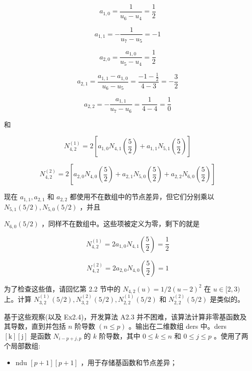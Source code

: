 \documentclass[../main.tex]{subfiles}
\begin{document}
\[
{a}_{1,0} = \frac{1}{{u}_{6} - {u}_{4}} = \frac{1}{2}
\]

\[
{a}_{1,1} =  - \frac{1}{{u}_{7} - {u}_{5}} =  - 1
\]

\[
{a}_{2,0} = \frac{{a}_{1,0}}{{u}_{5} - {u}_{4}} = \frac{1}{2}
\]

\[
{a}_{2,1} = \frac{{a}_{1,1} - {a}_{1,0}}{{u}_{6} - {u}_{5}} = \frac{-1 - \frac{1}{2}}{4 - 3} =  - \frac{3}{2}
\]

\[
{a}_{2,2} =  - \frac{{a}_{1,1}}{{u}_{7} - {u}_{6}} = \frac{1}{4 - 4} = \frac{1}{0}
\]

和

\[
{N}_{4,2}^{\left( 1\right) } = 2\left\lbrack  {{a}_{1,0}{N}_{4,1}\left( \frac{5}{2}\right)  + {a}_{1,1}{N}_{5,1}\left( \frac{5}{2}\right) }\right\rbrack
\]

\[
{N}_{4,2}^{\left( 2\right) } = 2\left\lbrack  {{a}_{2,0}{N}_{4,0}\left( \frac{5}{2}\right)  + {a}_{2,1}{N}_{5,0}\left( \frac{5}{2}\right)  + {a}_{2,2}{N}_{6,0}\left( \frac{5}{2}\right) }\right\rbrack
\]

现在 \({a}_{1,1},{a}_{2,1}\) 和 \({a}_{2,2}\) 都使用不在数组中的节点差异，但它们分别乘以 \({N}_{5,1}\left( {5/2}\right) ,{N}_{5,0}\left( {5/2}\right)\) ，并且

\({N}_{6,0}\left( {5/2}\right)\) ，同样不在数组中。这些项被定义为零，剩下的就是

\[
{N}_{4,2}^{\left( 1\right) } = 2{a}_{1,0}{N}_{4,1}\left( \frac{5}{2}\right)  = \frac{1}{2}
\]

\[
{N}_{4,2}^{\left( 2\right) } = 2{a}_{2,0}{N}_{4,0}\left( \frac{5}{2}\right)  = 1
\]

为了检查这些值，请回忆第 2.2 节中的 \({N}_{4,2}\left( u\right)  = 1/2{\left( u - 2\right) }^{2}\) 在 \(u \in  \lbrack 2,3)\) 上。计算 \({N}_{3,2}^{\left( 1\right) }\left( {5/2}\right) ,{N}_{3,2}^{\left( 2\right) }\left( {5/2}\right) ,{N}_{2,2}^{\left( 1\right) }\left( {5/2}\right)\) 和 \({N}_{2,2}^{\left( 2\right) }\left( {5/2}\right)\) 是类似的。

基于这些观察(以及 Ex2.4)，开发算法 A2.3 并不困难，该算法计算非零基函数及其导数，直到并包括 \(n\) 阶导数 \(\left( {n \leq  p}\right)\) 。输出在二维数组 ders 中。ders \(\left\lbrack  \mathrm{k}\right\rbrack  \left\lbrack  \mathrm{j}\right\rbrack\) 是函数 \({N}_{i - p + j,p}\) 的 \(k\) 阶导数，其中 \(0 \leq  k \leq  n\) 和 \(0 \leq  j \leq  p\) 。使用了两个局部数组:

\begin{itemize}
\item ndu \(\left\lbrack  {p + 1}\right\rbrack  \left\lbrack  {p + 1}\right\rbrack\) ，用于存储基函数和节点差异；
\end{itemize}
\end{document}
